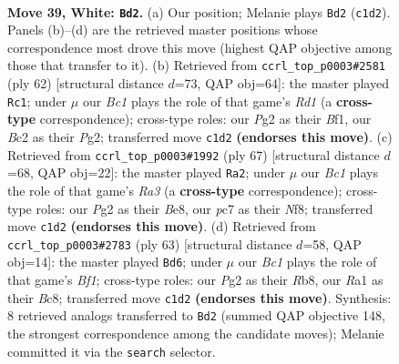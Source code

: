 \documentclass[11pt]{article}
\begin{document}
\clearpage

\begin{figure}[p]\centering
\begin{subfigure}{0.46\textwidth}\centering
\resizebox{\linewidth}{!}{%
\newchessgame
\chessboard[
  setfen={r1bq3k/ppp2pp1/5n1p/8/8/4QPbP/PPB3P1/R1B3K1 w - - 18 39},
  showmover=false,
  pgfstyle=straightmove, color=movearrow, markmove={c1-d2}
]}
\caption{}
\end{subfigure}\hfill
\begin{subfigure}{0.46\textwidth}\centering
\resizebox{\linewidth}{!}{%
\newchessgame
\chessboard[
  setfen={r6k/1ppn2b1/3pq2p/pP6/4p3/4B3/PP1Q2PP/3R1BK1 w - - 1 32},
  showmover=false,
  pgfstyle=straightmove, color=movearrow, markmove={d1-c1}
]}
\caption{}
\end{subfigure}
\\[4pt]
\begin{subfigure}{0.46\textwidth}\centering
\resizebox{\linewidth}{!}{%
\newchessgame
\chessboard[
  setfen={4bnk1/6p1/r2bp2p/1pq5/2p1B3/4PN1P/1PQ1NPP1/1R4K1 b - - 11 34},
  showmover=false,
  pgfstyle=straightmove, color=movearrow, markmove={a6-a2}
]}
\caption{}
\end{subfigure}\hfill
\begin{subfigure}{0.46\textwidth}\centering
\resizebox{\linewidth}{!}{%
\newchessgame
\chessboard[
  setfen={1rb2bk1/6p1/1p5p/3P1p2/p1P5/q2N2P1/P1Q3BP/1R5K b - - 1 32},
  showmover=false,
  pgfstyle=straightmove, color=movearrow, markmove={f8-d6}
]}
\caption{}
\end{subfigure}
\caption{\textbf{Move 39, White: \texttt{Bd2}.} (a) Our position; Melanie plays \texttt{Bd2} (\texttt{c1d2}). Panels (b)--(d) are the retrieved master positions whose correspondence most drove this move (highest QAP objective among those that transfer to it). (b) Retrieved from \texttt{ccrl\_top\_p0003\#2581} (ply 62) [structural distance $d$=73, QAP obj=64]: the master played \texttt{Rc1}; under $\mu$ our \emph{Bc1} plays the role of that game's \emph{Rd1} (a \textbf{cross-type} correspondence); cross-type roles: our \emph{P}g2 as their \emph{B}f1, our \emph{B}c2 as their \emph{P}g2; transferred move \texttt{c1d2} \textbf{(endorses this move)}. (c) Retrieved from \texttt{ccrl\_top\_p0003\#1992} (ply 67) [structural distance $d$=68, QAP obj=22]: the master played \texttt{Ra2}; under $\mu$ our \emph{Bc1} plays the role of that game's \emph{Ra3} (a \textbf{cross-type} correspondence); cross-type roles: our \emph{P}g2 as their \emph{B}e8, our \emph{p}c7 as their \emph{N}f8; transferred move \texttt{c1d2} \textbf{(endorses this move)}. (d) Retrieved from \texttt{ccrl\_top\_p0003\#2783} (ply 63) [structural distance $d$=58, QAP obj=14]: the master played \texttt{Bd6}; under $\mu$ our \emph{Bc1} plays the role of that game's \emph{Bf1}; cross-type roles: our \emph{P}g2 as their \emph{R}b8, our \emph{R}a1 as their \emph{B}c8; transferred move \texttt{c1d2} \textbf{(endorses this move)}. Synthesis: 8 retrieved analogs transferred to \texttt{Bd2} (summed QAP objective 148, the strongest correspondence among the candidate moves); Melanie committed it via the \texttt{search} selector.}
\label{fig:thought-m76}
\end{figure}
\end{document}
